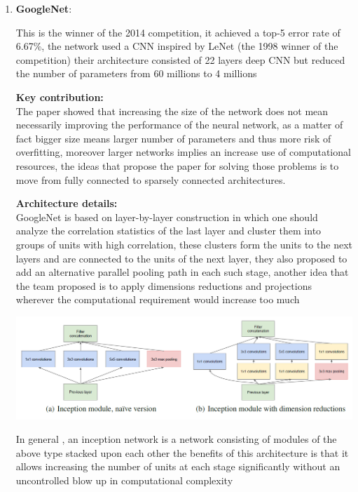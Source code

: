 \documentclass[12pt,a4paper]{report}
\begin{document}
\begin{enumerate}

\item \textbf{GoogleNet}:

This is the winner of the 2014 competition, it achieved a  top-5 error rate of 6.67\%, the network used a CNN inspired by LeNet (the 1998 winner of the competition) their architecture consisted of 22 layers deep CNN but reduced the number of parameters from 60 millions to 4 millions

\textbf{Key contribution:} \\
The paper showed that increasing the size of the network does not mean necessarily improving the performance of the neural network, as a matter of fact bigger size means larger number of parameters and thus more risk of overfitting, moreover larger networks implies an increase use of computational resources, the ideas that propose the paper for solving those problems is to move from fully connected to sparsely connected architectures.  

\textbf{Architecture details:}\\
GoogleNet is based on layer-by-layer construction in which one should analyze the correlation statistics of the last layer and cluster them into groups of units with high correlation, these clusters form the units to the next layers and are connected to the units of the next layer, they also proposed to add an alternative parallel pooling path in each such stage, another idea that the team proposed is to apply dimensions reductions and projections wherever the computational requirement would increase too much  
 
\begin{center}
\includegraphics[width=15cm]{Capture1.png}
\end{center}

In general , an inception network is a network consisting of modules of the above type stacked upon each other 
the benefits of this architecture is that it allows increasing the number of units at each stage significantly without an uncontrolled blow up in computational complexity 	


\end{enumerate}
\end{document}
